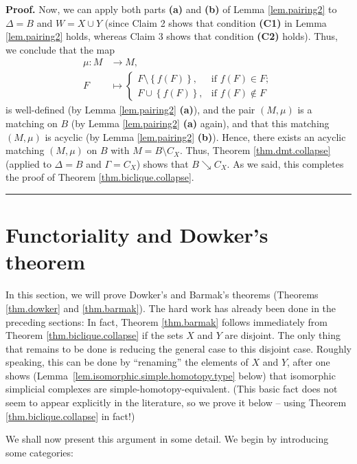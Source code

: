 \documentclass[numbers=enddot,12pt,final,onecolumn,notitlepage]{scrartcl}%
\theoremstyle{definition}
\newenvironment{proof}[1][Proof]{\noindent\textbf{#1.} }{\ \rule{0.5em}{0.5em}}
\begin{document}
\begin{proof}
Now, we can apply both parts \textbf{(a)} and \textbf{(b)} of Lemma
\ref{lem.pairing2} to $\Delta=B$ and $W=X\cup Y$ (since Claim 2 shows that
condition \textbf{(C1)} in Lemma \ref{lem.pairing2} holds, whereas Claim 3
shows that condition \textbf{(C2)} holds). Thus, we conclude that the map%
\begin{align*}
\mu:M  &  \rightarrow M,\\
F  &  \mapsto%
\begin{cases}
F\setminus\left\{  f\left(  F\right)  \right\}  , & \text{if }f\left(
F\right)  \in F;\\
F\cup\left\{  f\left(  F\right)  \right\}  , & \text{if }f\left(  F\right)
\notin F
\end{cases}
\end{align*}
is well-defined (by Lemma \ref{lem.pairing2} \textbf{(a)}), and the pair
$\left(  M,\mu\right)  $ is a matching on $B$ (by Lemma \ref{lem.pairing2}
\textbf{(a)} again), and that this matching $\left(  M,\mu\right)  $ is
acyclic (by Lemma \ref{lem.pairing2} \textbf{(b)}). Hence, there exists an
acyclic matching $\left(  M,\mu\right)  $ on $B$ with $M=B\setminus C_{X}$.
Thus, Theorem \ref{thm.dmt.collapse} (applied to $\Delta=B$ and $\Gamma=C_{X}%
$) shows that $B\searrow C_{X}$. As we said, this completes the proof of
Theorem \ref{thm.biclique.collapse}.
\end{proof}


\section{Functoriality and Dowker's theorem}

In this section, we will prove Dowker's and Barmak's theorems
(Theorems \ref{thm.dowker} and \ref{thm.barmak}).
The hard work has already been done in the preceding sections:
In fact, Theorem \ref{thm.barmak} follows immediately from
Theorem \ref{thm.biclique.collapse} if the sets $X$ and $Y$ are disjoint.
The only thing that remains to be done is reducing the general case
to this disjoint case.
Roughly speaking, this can be done by ``renaming'' the elements of
$X$ and $Y$, after one shows (Lemma~\ref{lem.isomorphic.simple.homotopy.type}
below) that isomorphic simplicial complexes are simple-homotopy-equivalent.
(This basic fact does not seem to appear explicitly in the literature,
so we prove it below -- using Theorem \ref{thm.biclique.collapse}
in fact!)

We shall now present this argument in some detail.
We begin by introducing some categories:
\end{document}
